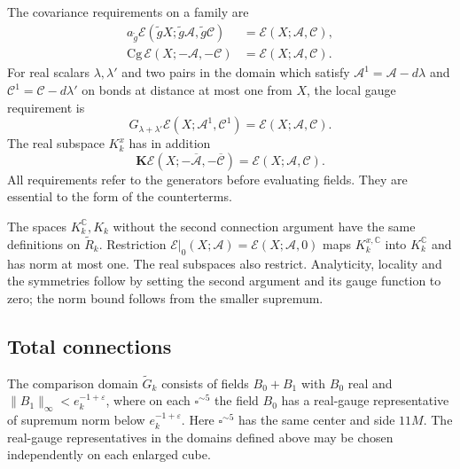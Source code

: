 \documentclass[11pt,letterpaper,reqno]{amsart}
\newcommand{\C}{\mathbb C}
\begin{document}
The covariance requirements on a family are
\begin{equation}\label{eq:rg-activity-symmetries}
 \begin{split}
 a_{\tilde g}\mathscr E(\tilde gX;\tilde g\mathscr A,
                                      \tilde g\mathscr C)
                                  &=\mathscr E(X;\mathscr A,\mathscr C),\\
 \mathrm{Cg}\,\mathscr E(X;-\mathscr A,-\mathscr C)
                                  &=\mathscr E(X;\mathscr A,\mathscr C).
 \end{split}
\end{equation}
For real scalars $\lambda,\lambda'$ and two pairs in the domain
which satisfy $\mathscr A^1=\mathscr A-d\lambda$ and
$\mathscr C^1=\mathscr C-d\lambda'$ on bonds at distance at
most one from $X$, the local gauge requirement is
\[
 G_{\lambda+\lambda'}\mathscr E(X;\mathscr A^1,\mathscr C^1)
                               =\mathscr E(X;\mathscr A,\mathscr C).
\]
The real subspace $K_k^x$ has in addition
\[
 \mathbf K\mathscr E(X;-\overline{\mathscr A},-\overline{\mathscr C})
                               =\mathscr E(X;\mathscr A,\mathscr C).
\]
All requirements refer to the generators before evaluating fields.
They are essential to the form of the counterterms.

The spaces $K_k^\C,K_k$ without the second connection argument
have the same definitions on $\widetilde R_k$. Restriction
$\mathscr E|_0(X;\mathscr A)=\mathscr E(X;\mathscr A,0)$ maps
$K_k^{x,\C}$ into $K_k^\C$ and has norm at most one. The real
subspaces also restrict. Analyticity, locality and the symmetries
follow by setting the second argument and its gauge function to
zero; the norm bound follows from the smaller supremum.

\subsection{Total connections}
\label{subsec:rg-total-connection-domain}

The comparison domain $\widetilde G_k$ consists of fields $B_0+B_1$
with $B_0$ real and $\|B_1\|_\infty<e_k^{-1+\varepsilon}$,
where on each $\square^{\sim5}$ the field $B_0$ has a real-gauge
representative of supremum norm below $e_k^{-1+\varepsilon}$.
Here $\square^{\sim5}$ has the same center and side $11M$.
The real-gauge representatives in the domains defined above may
be chosen independently on each enlarged cube.
\end{document}
